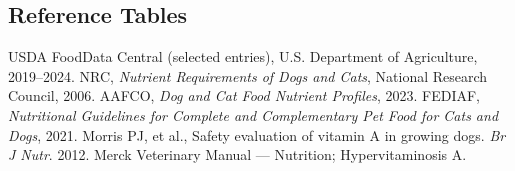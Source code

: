 \subsection*{Reference Tables}
\begin{thebibliography}{9}
 USDA FoodData Central (selected entries), U.S. Department of Agriculture, 2019--2024. 
 NRC, \textit{Nutrient Requirements of Dogs and Cats}, National Research Council, 2006. 
 AAFCO, \textit{Dog and Cat Food Nutrient Profiles}, 2023. 
 FEDIAF, \textit{Nutritional Guidelines for Complete and Complementary Pet Food for Cats and Dogs}, 2021. 
 Morris PJ, et al., Safety evaluation of vitamin A in growing dogs. \textit{Br J Nutr}. 2012. 
 Merck Veterinary Manual --- Nutrition; Hypervitaminosis A. 
\end{thebibliography}
